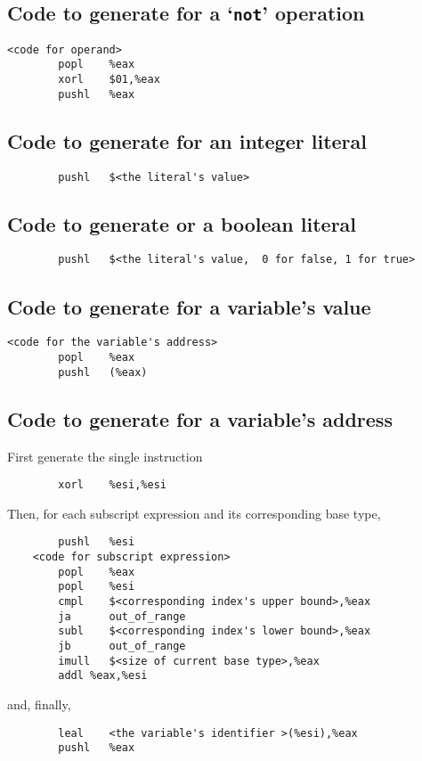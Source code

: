 \documentclass{article}
\begin{document}
\subsection*{Code to generate for a `\texttt{not}' operation}
\begin{verbatim}
<code for operand>
        popl    %eax
        xorl    $01,%eax
        pushl   %eax
\end{verbatim}

\subsection*{Code to generate for an integer literal}
\begin{verbatim}
        pushl   $<the literal's value>
\end{verbatim}

\subsection*{Code to generate or a boolean literal}
\begin{verbatim}
        pushl   $<the literal's value,  0 for false, 1 for true>
\end{verbatim}

\subsection*{Code to generate for a variable's value}
\begin{verbatim}
<code for the variable's address>
        popl    %eax
        pushl   (%eax)
\end{verbatim}


\subsection*{Code to generate for a variable's address}
First generate the single instruction
\begin{verbatim}
        xorl    %esi,%esi
\end{verbatim}
Then, for each subscript expression and its corresponding base type,
\begin{verbatim}
        pushl   %esi
    <code for subscript expression>
        popl    %eax
        popl    %esi
        cmpl    $<corresponding index's upper bound>,%eax
        ja      out_of_range
        subl    $<corresponding index's lower bound>,%eax
        jb      out_of_range
        imull   $<size of current base type>,%eax
        addl %eax,%esi
\end{verbatim}
and, finally,
\begin{verbatim}
        leal    <the variable's identifier >(%esi),%eax
        pushl   %eax
\end{verbatim}
\end{document}
